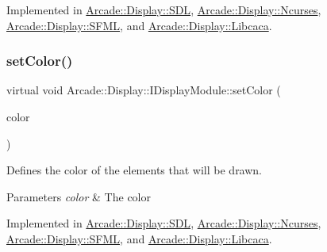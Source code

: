 Implemented in \mbox{\hyperlink{classArcade_1_1Display_1_1SDL_aa3bd454c083beb16300bb799ed268ef7}{Arcade\+::\+Display\+::\+S\+DL}}, \mbox{\hyperlink{classArcade_1_1Display_1_1Ncurses_af660e53523f4d13cc33612ac94c7da97}{Arcade\+::\+Display\+::\+Ncurses}}, \mbox{\hyperlink{classArcade_1_1Display_1_1SFML_a88bb03b669afd0df748fd66bf24d45f3}{Arcade\+::\+Display\+::\+S\+F\+ML}}, and \mbox{\hyperlink{classArcade_1_1Display_1_1Libcaca_a2d4198dc8e383672ac00114d10b11e01}{Arcade\+::\+Display\+::\+Libcaca}}.

\mbox{\label{classArcade_1_1Display_1_1IDisplayModule_a9f81148f93a249d6fc91307819911b4e}} 
\subsubsection{\texorpdfstring{setColor()}{setColor()}}
{\footnotesize\ttfamily virtual void Arcade\+::\+Display\+::\+I\+Display\+Module\+::set\+Color (\begin{DoxyParamCaption}\item[{\mbox{\hyperlink{classArcade_1_1Display_1_1IDisplayModule_ae0a776be9163d096051c522e21c007b2}{I\+Display\+Module\+::\+Colors}}}]{color }\end{DoxyParamCaption})\hspace{0.3cm}{\ttfamily [pure virtual]}}



Defines the color of the elements that will be drawn. 


\begin{DoxyParams}{Parameters}
{\em color} & The color \\
\hline
\end{DoxyParams}


Implemented in \mbox{\hyperlink{classArcade_1_1Display_1_1SDL_a857d2a5ab8266a1e11f528f398e3f55d}{Arcade\+::\+Display\+::\+S\+DL}}, \mbox{\hyperlink{classArcade_1_1Display_1_1Ncurses_a2b9c5de7068fcf6c85b0201d5de0fade}{Arcade\+::\+Display\+::\+Ncurses}}, \mbox{\hyperlink{classArcade_1_1Display_1_1SFML_aee515eb3ff41dc4f23a0115d2bc4f4a7}{Arcade\+::\+Display\+::\+S\+F\+ML}}, and \mbox{\hyperlink{classArcade_1_1Display_1_1Libcaca_aec7af72c1ffd1a3af05b4d8cf3edf84e}{Arcade\+::\+Display\+::\+Libcaca}}.

\mbox{\label{classArcade_1_1Display_1_1IDisplayModule_adc5d499229aa5899bbd4bae14f00cb27}} 
